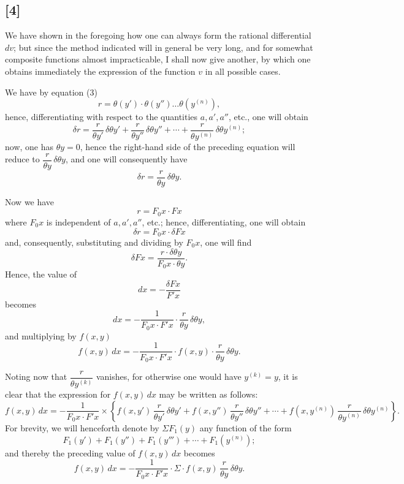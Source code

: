 \documentclass{article}
\begin{document}
\subsection*{[4]}

We have shown in the foregoing how one can always form the rational differential $dv$; but since the method indicated will in general be very long, and for somewhat composite functions almost impracticable, I shall now give another, by which one obtains immediately the expression of the function $v$ in all possible cases.

We have by equation (3)
\[ r = \theta(y') \cdot \theta(y'') \ldots \theta(y^{(n)}), \]
hence, differentiating with respect to the quantities $a, a', a''$, etc., one will obtain
\[ \delta r = \frac{r}{\theta y'}\,\delta\theta y' + \frac{r}{\theta y''}\,\delta\theta y'' + \cdots + \frac{r}{\theta y^{(n)}}\,\delta\theta y^{(n)}; \]
now, one has $\theta y = 0$, hence the right-hand side of the preceding equation will reduce to $\dfrac{r}{\theta y}\,\delta\theta y$, and one will consequently have
\[ \delta r = \frac{r}{\theta y}\,\delta\theta y. \]

Now we have
\[ r = F_0 x \cdot F x \]
where $F_0 x$ is independent of $a, a', a''$, etc.; hence, differentiating, one will obtain
\[ \delta r = F_0 x \cdot \delta F x \]
and, consequently, substituting and dividing by $F_0 x$, one will find
\[ \delta F x = \frac{r \cdot \delta\theta y}{F_0 x \cdot \theta y}. \]
Hence, the value of
\[ dx = -\frac{\delta F x}{F' x} \]
becomes
\[ dx = -\frac{1}{F_0 x \cdot F' x} \cdot \frac{r}{\theta y}\,\delta\theta y, \]
and multiplying by $f(x, y)$
\[ f(x, y)\,dx = -\frac{1}{F_0 x \cdot F' x} \cdot f(x, y) \cdot \frac{r}{\theta y}\,\delta\theta y. \]

Noting now that $\dfrac{r}{\theta y^{(k)}}$ vanishes, for otherwise one would have $y^{(k)} = y$, it is clear that the expression for $f(x, y)\,dx$ may be written as follows:
\[ f(x, y)\,dx = -\frac{1}{F_0 x \cdot F' x} \times \left\{ f(x, y')\,\frac{r}{\theta y'}\,\delta\theta y' + f(x, y'')\,\frac{r}{\theta y''}\,\delta\theta y'' + \cdots + f(x, y^{(n)})\,\frac{r}{\theta y^{(n)}}\,\delta\theta y^{(n)} \right\}. \]
For brevity, we will henceforth denote by $\Sigma F_1(y)$ any function of the form
\[ F_1(y') + F_1(y'') + F_1(y''') + \cdots + F_1(y^{(n)}); \]
and thereby the preceding value of $f(x, y)\,dx$ becomes
\[ f(x, y)\,dx = -\frac{1}{F_0 x \cdot F' x} \cdot \Sigma \cdot f(x, y)\,\frac{r}{\theta y}\,\delta\theta y. \tag{15} \]
\end{document}
